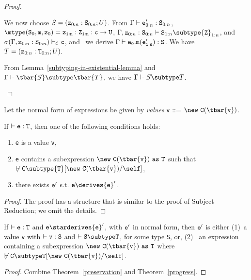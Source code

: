 \begin{proof}
\begin{itemize}
\begin{itemize}
{            We now choose 
               $S=({\tt z}_{0:n}: {\tt S}_{0:n}; U)$.
            From 
            $\Gamma \vdash {\tt e}_{0:n}': {\tt S}_{0:n}$,
            $\mtype({\tt S}_0,{\tt m},{\tt z}_0) =
               \tt {\tt z}_{1:n}: {\tt Z}_{1:n}:c \rightarrow {\tt U}$,
            $\Gamma, {\tt z}_{0:n}: {\tt S}_{0:n} \vdash
                  {\tt S}_{1:n} \subtype {\tt Z}_{1:n}$, and
            $\sigma(\Gamma, {\tt z}_{0:n}: {\tt S}_{0:n}) \vdash_{\cal C}
                  {\tt c}$,
            and \TInvk\ we derive
            $\Gamma \vdash {\tt e_0.m(e_{1:n}')}: {\tt S}$.
            We have 
               $T=({\tt z}_{0:n}: {\tt T}_{0:n}; U)$.

            From Lemma~\ref{subtyping-in-existential-lemma} and
            $\Gamma \vdash \tbar{S} \subtype \tbar{T}$, we have
            $\Gamma \vdash S \subtype T$.
   }
   \end{itemize}
\end{itemize}
\end{proof}

\noindent
Let the normal form of expressions be given by {\em values}
{\tt v} {::=} $\new\ {\tt C(\tbar{v})}$.

\begin{theorem}[Progress] 
\label{progress}
If $\vdash {\tt e: T}$, then one of the following conditions holds:
\begin{enumerate}
\item {\tt e} is a value {\tt v}, 
\item {\tt e} contains a subexpression ${\tt \new\ C(\tbar{v})~as~T}$ such that
$\not\vdash {\tt C} \subtype {\tt T}[{\tt \new\ C(\tbar{v})}/\self]$,
\item there exists ${\tt e}'$ s.t. ${\tt e} \derives {\tt e}'$.
\end{enumerate}
\end{theorem}

\begin{proof}
The proof has a structure that is similar to the proof of Subject Reduction;
we omit the details.
\end{proof}

\begin{theorem} 
\label{type-soundness}
If $\vdash {\tt e: T}$ and ${\tt e} \starderives {\tt e}'$, with ${\tt
e}'$ in normal form, then ${\tt e}'$ is either (1)~a value {\tt v}
with $\vdash {\tt v: S}$ and $\vdash {\tt S \subtype T}$,
for some type {\tt S}, or, (2)~ an expression containing
a subexpression ${\tt \new\ {\tt C(\tbar{v})~as~T}}$ where 
$\not\vdash \tt C\subtype T[\new\ C(\tbar{v})/\self]$.

\end{theorem}

\begin{proof}
Combine Theorem~\ref{preservation} and Theorem~\ref{progress}.
\end{proof}


